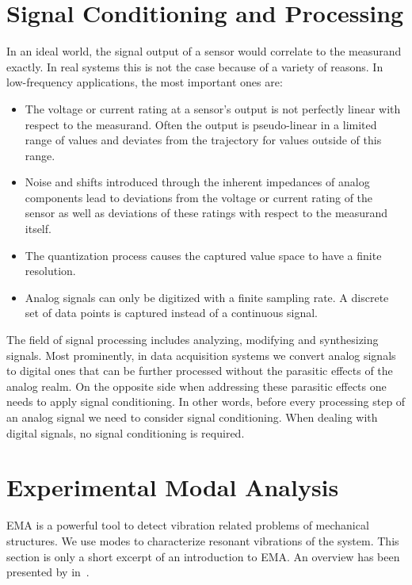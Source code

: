 \section{Signal Conditioning and Processing}
In an ideal world, the signal output of a sensor would correlate to the measurand exactly. In real systems this is not the case because of a variety of reasons. In low-frequency applications, the most important ones are:

\begin{itemize}
  \item The voltage or current rating at a sensor's output is not perfectly linear with respect to the measurand. Often the output is pseudo-linear in a limited range of values and deviates from the trajectory for values outside of this range.
  \item Noise and shifts introduced through the inherent impedances of analog components lead to deviations from the voltage or current rating of the sensor as well as deviations of these ratings with respect to the measurand itself.
  \item The quantization process causes the captured value space to have a finite resolution.
  \item Analog signals can only be digitized with a finite sampling rate. A discrete set of data points is captured instead of a continuous signal.
\end{itemize}

The field of signal processing includes analyzing, modifying and synthesizing signals. Most prominently, in data acquisition systems we convert analog signals to digital ones that can be further processed without the parasitic effects of the analog realm. On the opposite side when addressing these parasitic effects one needs to apply signal conditioning. In other words, before every processing step of an analog signal we need to consider signal conditioning. When dealing with digital signals, no signal conditioning is required.

\section{Experimental Modal Analysis}

\ac{EMA} is a powerful tool to detect vibration related problems of mechanical structures. We use modes to characterize resonant vibrations of the system. This section is only a short excerpt of an introduction to \ac{EMA}. An overview has been presented by \citeauthor{schwarz1999experimental} in~\cite{schwarz1999experimental}.


